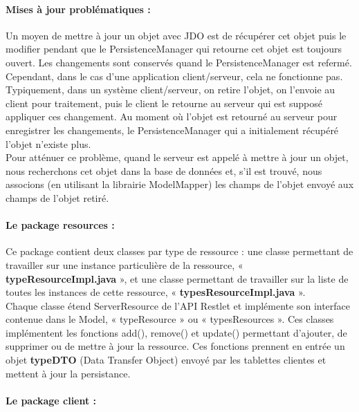 \documentclass{article}
\begin{document}
\paragraph{Mises à jour problématiques :}

Un moyen de mettre à jour un objet avec JDO est de récupérer cet objet puis le modifier pendant que le PersistenceManager qui retourne cet objet est toujours ouvert. Les changements sont conservés quand le PersistenceManager est refermé. Cependant, dans le cas d’une application client/serveur, cela ne fonctionne pas.\\


Typiquement, dans un système client/serveur, on retire l’objet, on l’envoie au client pour traitement, puis le client le retourne au serveur qui est supposé appliquer ces changement. Au moment où l’objet est retourné au serveur pour enregistrer les changements, le PersistenceManager qui a initialement récupéré l’objet n’existe plus.\\


Pour atténuer ce problème, quand le serveur est appelé à mettre à jour un objet, nous recherchons cet objet dans la base de données et, s’il est trouvé, nous associons (en utilisant la librairie ModelMapper) les champs de l’objet envoyé aux champs de l’objet retiré.\\


\paragraph{Le package resources :}

Ce package contient deux classes par type de ressource : une classe permettant de travailler sur une instance particulière de la ressource, « \textbf{typeResourceImpl.java} », et une classe permettant de travailler sur la liste de toutes les instances de cette ressource, « \textbf{typesResourceImpl.java} ».\\


Chaque classe étend ServerResource de l'API Restlet et implémente son interface contenue dans le Model, « typeResource » ou « typesResources ». Ces classes implémentent les fonctions add(), remove() et update() permettant d'ajouter, de supprimer ou de mettre à jour la ressource. Ces fonctions prennent en entrée un objet \textbf{typeDTO} (Data Transfer Object) envoyé par les tablettes clientes et mettent à jour la persistance.\\


\paragraph{Le package client :}
\end{document}
